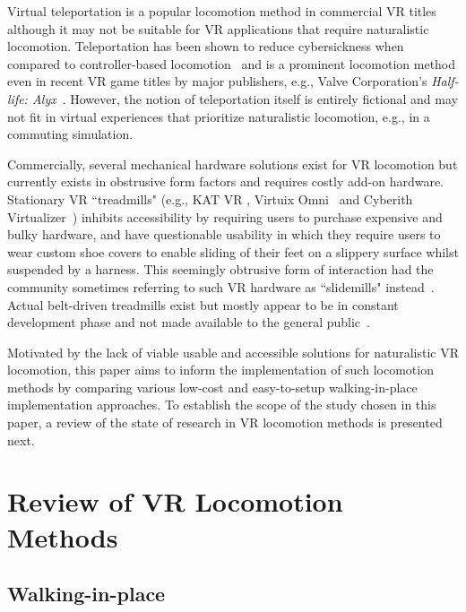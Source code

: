 \documentclass[manuscript,review,anonymous]{acmart}
\begin{document}
Virtual teleportation is a popular locomotion method in commercial VR titles although it may not be suitable for VR applications that require naturalistic locomotion. Teleportation has been shown to reduce cybersickness when compared to controller-based locomotion~\cite{teleportLessCybersickness2017} and is a prominent locomotion method even in recent VR game titles by major publishers, e.g., Valve Corporation's \emph{Half-life: Alyx}~\cite{halfLifeAlyxonSteam2021}. However, the notion of teleportation itself is entirely fictional and may not fit in virtual experiences that prioritize naturalistic locomotion, e.g., in a commuting simulation.

Commercially, several mechanical hardware solutions exist for VR locomotion but currently exists in obstrusive form factors and requires costly add-on hardware. Stationary VR ``treadmills" (e.g., KAT VR \cite{KATVROfficialSite2021}, Virtuix Omni~\cite{virtuixOmniOfficialSite2021} and Cyberith Virtualizer~\cite{cyberithVirtualizer2021}) inhibits accessibility by requiring users to purchase expensive and bulky hardware, and have questionable usability in which they require users to wear custom shoe covers to enable sliding of their feet on a slippery surface whilst suspended by a harness. This seemingly obtrusive form of interaction had the community sometimes referring to such VR hardware as ``slidemills" instead~\cite{slidemillsAniwaablog2018}. Actual belt-driven treadmills exist but mostly appear to be in constant development phase and not made available to the general public~\cite{infinadeck2021,spaceWalkerVR2021,aperiumRealityK01Pod2021}.

Motivated by the lack of viable usable and accessible solutions for naturalistic VR locomotion, this paper aims to inform the implementation of such locomotion methods by comparing various low-cost and easy-to-setup walking-in-place implementation approaches. To establish the scope of the study chosen in this paper, a review of the state of research in VR locomotion methods is presented next.


\section{Review of VR Locomotion Methods}

\subsection{Walking-in-place}
\end{document}
